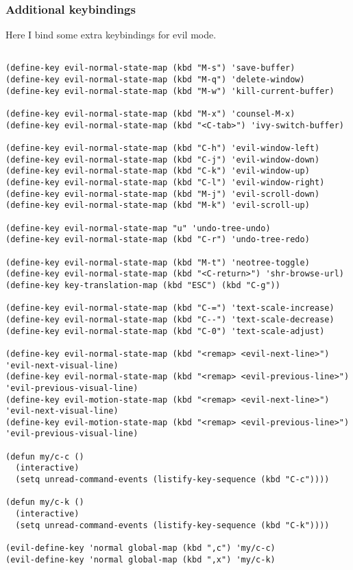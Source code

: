 \documentclass[11pt]{article}
\begin{document}
\subsubsection*{Additional keybindings}
\label{sec:org8084d9c}

Here I bind some extra keybindings for evil mode.

\begin{verbatim}

(define-key evil-normal-state-map (kbd "M-s") 'save-buffer)
(define-key evil-normal-state-map (kbd "M-q") 'delete-window)
(define-key evil-normal-state-map (kbd "M-w") 'kill-current-buffer)

(define-key evil-normal-state-map (kbd "M-x") 'counsel-M-x)
(define-key evil-normal-state-map (kbd "<C-tab>") 'ivy-switch-buffer)

(define-key evil-normal-state-map (kbd "C-h") 'evil-window-left)
(define-key evil-normal-state-map (kbd "C-j") 'evil-window-down)
(define-key evil-normal-state-map (kbd "C-k") 'evil-window-up)
(define-key evil-normal-state-map (kbd "C-l") 'evil-window-right)
(define-key evil-normal-state-map (kbd "M-j") 'evil-scroll-down)
(define-key evil-normal-state-map (kbd "M-k") 'evil-scroll-up)

(define-key evil-normal-state-map "u" 'undo-tree-undo)
(define-key evil-normal-state-map (kbd "C-r") 'undo-tree-redo)

(define-key evil-normal-state-map (kbd "M-t") 'neotree-toggle)
(define-key evil-normal-state-map (kbd "<C-return>") 'shr-browse-url)
(define-key key-translation-map (kbd "ESC") (kbd "C-g"))

(define-key evil-normal-state-map (kbd "C-=") 'text-scale-increase)
(define-key evil-normal-state-map (kbd "C--") 'text-scale-decrease)
(define-key evil-normal-state-map (kbd "C-0") 'text-scale-adjust)

(define-key evil-normal-state-map (kbd "<remap> <evil-next-line>") 'evil-next-visual-line)
(define-key evil-normal-state-map (kbd "<remap> <evil-previous-line>") 'evil-previous-visual-line)
(define-key evil-motion-state-map (kbd "<remap> <evil-next-line>") 'evil-next-visual-line)
(define-key evil-motion-state-map (kbd "<remap> <evil-previous-line>") 'evil-previous-visual-line)

(defun my/c-c ()
  (interactive)
  (setq unread-command-events (listify-key-sequence (kbd "C-c"))))

(defun my/c-k ()
  (interactive)
  (setq unread-command-events (listify-key-sequence (kbd "C-k"))))

(evil-define-key 'normal global-map (kbd ",c") 'my/c-c)
(evil-define-key 'normal global-map (kbd ",x") 'my/c-k)
\end{verbatim}
\end{document}
